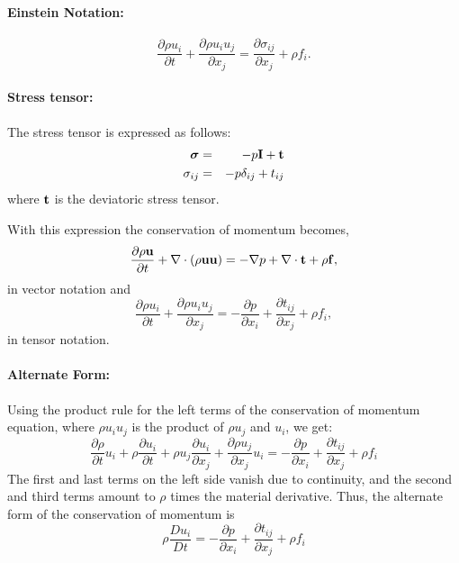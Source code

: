 \documentclass[oneside,a4paper,11pt]{report}
\begin{document}
\paragraph{Einstein Notation:}
\begin{equation}
    \label{eq:momentum_conservation_tensor}
    \boxed{\frac{\partial \rho u_i}{\partial t}+\frac{\partial \rho u_i u_j}{\partial x_j} = \frac{\partial \sigma_{ij}}{\partial x_j} + \rho f_i.}
\end{equation}

\paragraph{Stress tensor:}
The stress tensor is expressed as follows:
\begin{eqnarray*}
\boldsymbol{\sigma} &=& -p \mathbf{I} + \mathbf{t} \\
\sigma_{ij}&=&-p \delta_{ij}+t_{ij}
\end{eqnarray*}
where $\mathbf{t}$ is the deviatoric stress tensor.
 
With this expression the conservation of momentum becomes,
\begin{equation}
    \frac{\partial \rho\mathbf{u} }{\partial t} +\nabla \cdot (\rho\mathbf{u} \mathbf{u} ) = -\nabla p + \nabla\cdot \mathbf{t} +\rho \mathbf{f},
\end{equation}
in vector notation and 
\begin{equation}
    \frac{\partial \rho u_i}{\partial t}+\frac{\partial \rho u_i u_j}{\partial x_j}=-\frac{\partial p}{\partial x_i} + \frac{\partial t_{ij}}{\partial x_j} + \rho f_i,
\end{equation}
in tensor notation.

\paragraph{Alternate Form:}
Using the product rule for the left terms of the conservation of momentum equation, where $\rho u_iu_j$ is the product of $\rho u_j$ and $u_i$, we get:
\[\frac{\partial \rho}{\partial t}u_i+\rho\frac{\partial u_i}{\partial t}+\rho u_j\frac{\partial u_i}{\partial x_j}+\frac{\partial \rho u_j}{\partial x_j}u_i=-\frac{\partial p}{\partial x_i} + \frac{\partial t_{ij}}{\partial x_j} + \rho f_i\]
The first and last terms on the left side vanish due to continuity, and the second and third terms amount to $\rho$ times the material derivative. Thus, the alternate form of the conservation of momentum is
\begin{equation}
\label{eq:diff_cons_momentum}
\rho\frac{D u_i}{Dt}=-\frac{\partial p}{\partial x_i} + \frac{\partial t_{ij}}{\partial x_j} + \rho f_i
\end{equation}
\end{document}
